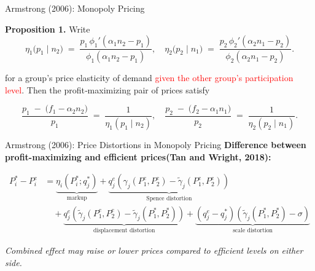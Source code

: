 \documentclass[aspectratio=169]{beamer}  %
\begin{document}
\begin{frame}{Armstrong (2006): Monopoly Pricing}
    \justifying  %
    
    \textbf{Proposition 1.} Write
    \[
      \eta_{1}\bigl(p_{1} \mid n_{2}\bigr) 
      \;=\; 
      \frac{p_{1}\,\phi_{1}'(\alpha_{1}n_{2} - p_{1})}{\phi_{1}(\alpha_{1}n_{2} - p_{1})},
      \quad
      \eta_{2}\bigl(p_{2} \mid n_{1}\bigr) 
      \;=\;
      \frac{p_{2}\,\phi_{2}'(\alpha_{2}n_{1} - p_{2})}{\phi_{2}(\alpha_{2}n_{1} - p_{2})}.
    \]
    
    for a group’s price elasticity of demand \textcolor{red}{given the other group’s participation level}.  
    Then the profit‐maximizing pair of prices satisfy
    
    \[
      \frac{p_{1} \;-\; \bigl(f_{1} - \alpha_{2}n_{2}\bigr)}{p_{1}}
      \;=\;
      \frac{1}{\eta_{1}(p_{1} \mid n_{2})},
      \quad
      \frac{p_{2} \;-\; \bigl(f_{2} - \alpha_{1}n_{1}\bigr)}{p_{2}}
      \;=\;
      \frac{1}{\eta_{2}(p_{2} \mid n_{1})}.
    \]
    
    \end{frame}

\begin{frame}{Armstrong (2006): Price Distortions in Monopoly Pricing}
        \large
        \textbf{Difference between profit-maximizing and efficient prices(Tan and Wright, 2018):}
        
        \vspace{0.5em}
        
        \begin{equation*}
        \begin{aligned}
        P_i^* - P_i^e &= \underbrace{\eta_i\left(P_i^*; q_j^*\right)}_{\text{markup}} 
        + \underbrace{q_j^e \left( \gamma_j(P_1^e, P_2^e) - \tilde{\gamma}_j(P_1^e, P_2^e) \right)}_{\text{Spence distortion}} \\
        &\quad + \underbrace{q_j^e \left( \tilde{\gamma}_j(P_1^e, P_2^e) - \tilde{\gamma}_j(P_1^*, P_2^*) \right)}_{\text{displacement distortion}} 
        + \underbrace{\left(q_j^e - q_j^*\right)\left( \tilde{\gamma}_j(P_1^*, P_2^*) - \sigma \right)}_{\text{scale distortion}}
        \end{aligned}
        \end{equation*}
        
        \vspace{0.5em}
        

        
        \textit{Combined effect may raise or lower prices compared to efficient levels on either side.}
\end{frame}
        
\end{document}
